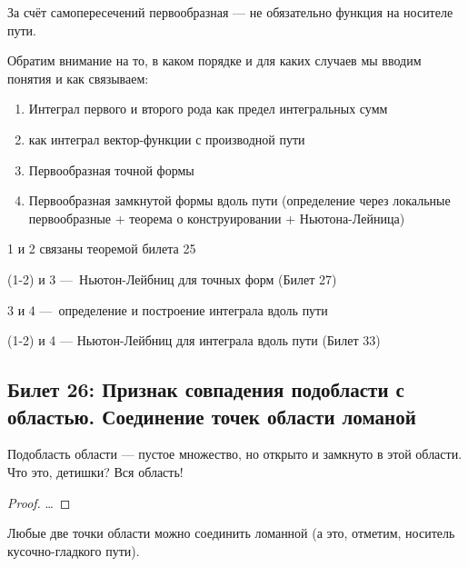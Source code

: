 \documentclass[12pt, a4paper, oneside]{memoir}
\begin{document}
\begin{remark}
    За счёт самопересечений первообразная — не обязательно функция на носителе пути.
\end{remark}

\begin{remark}
    Обратим внимание на то, в каком порядке и для каких случаев мы вводим понятия и как связываем:

    \begin{enumerate}
        \item Интеграл первого и второго рода как предел интегральных сумм
        \item \ditto как интеграл вектор-функции с производной пути 
        \item Первообразная точной формы
        \item Первообразная замкнутой формы вдоль пути (определение через локальные первообразные + теорема о конструировании + Ньютона-Лейница)
    \end{enumerate}
    
    1 и 2 связаны теоремой билета 25
    
    (1-2) и 3 — Ньютон-Лейбниц для точных форм (Билет 27)
        
    3 и 4 — определение и построение интеграла вдоль пути
    
    (1-2) и 4 — Ньютон-Лейбниц для интеграла вдоль пути (Билет 33)
\end{remark}


\subsection{Билет 26: Признак совпадения подобласти с областью. Соединение точек области ломаной}

\begin{lemma}\label{thm:Признак совпадения подобласти с областью}
    Подобласть области — пустое множество, но открыто и замкнуто в этой области. Что это, детишки? Вся область!
    
    \begin{proof}
        …
    \end{proof}
\end{lemma}

\begin{theorem}
    Любые две точки области можно соединить ломанной (а это, отметим, носитель кусочно-гладкого пути).
\end{theorem}
\end{document}
